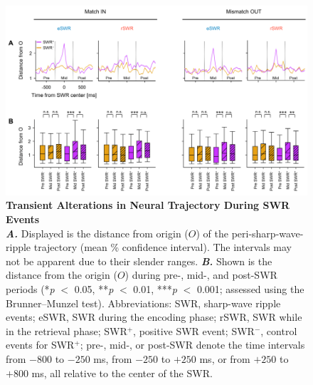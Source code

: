 \documentclass[final,3p,times,twocolumn]{elsarticle}
\begin{document}
        \clearpage
        \begin{figure}[ht]
        	\centering
            \includegraphics[width=1\textwidth]{./src/figures/.png/Figure_ID_05.png}
        	\caption{\textbf{
Transient Alterations in Neural Trajectory During SWR Events
}
\smallskip
\\
\textbf{\textit{A.}} Displayed is the distance from origin ($O$) of the peri-sharp-wave-ripple trajectory (mean \% confidence interval). The intervals may not be apparent due to their slender ranges. \textbf{\textit{B.}} Shown is the distance from the origin ($O$) during pre-, mid-, and post-SWR periods (*\textit{p} $<$ 0.05, **\textit{p} $<$ 0.01, ***\textit{p} $<$ 0.001; assessed using the Brunner--Munzel test). Abbreviations: SWR, sharp-wave ripple events; eSWR, SWR during the encoding phase; rSWR, SWR while in the retrieval phase; SWR$^+$, positive SWR event; SWR$^-$, control events for SWR$^+$; pre-, mid-, or post-SWR denote the time intervals from $-800$ to $-250$ ms, from $-250$ to $+250$ ms, or from $+250$ to $+800$ ms, all relative to the center of the SWR.
}
        	\label{fig:05}
        \end{figure}
        \clearpage
\end{document}
